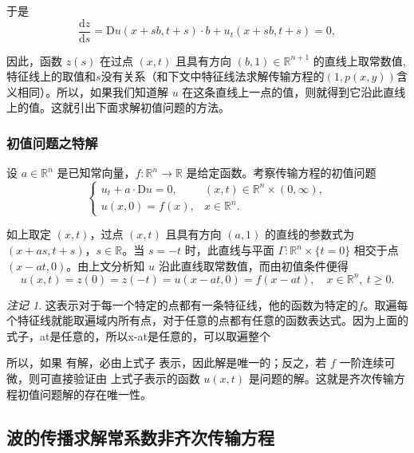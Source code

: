 \documentclass[12pt,a4paper]{article}
\numberwithin{subsection}{section}   %
\numberwithin{subsubsection}{subsection}
\theoremstyle{plain}
\theoremstyle{definition}
\theoremstyle{remark}
\newtheorem{remark}[theorem]{注记}
\theoremstyle{remark}
\begin{document}
	于是
	\begin{equation}
	\frac{\mathrm{d}z}{\mathrm{d}s} = \mathrm{D}u(x + sb, t + s) \cdot b + u_t(x + sb, t + s) = 0,
	\end{equation}
	
	因此，函数 \(z(s)\) 在过点 \((x, t)\) 且具有方向 \((b, 1) \in \mathbb{R}^{n+1}\) 的直线上取常数值,特征线上的取值和$s$没有关系（和下文中特征线法求解传输方程的$(1, p(x, y))$含义相同）。所以，如果我们知道解 \(u\) 在这条直线上一点的值，则就得到它沿此直线上的值。这就引出下面求解初值问题的方法。
	
	\subsubsection{初值问题之特解} 
	设 $a \in \mathbb{R}^n$ 是已知常向量，$f: \mathbb{R}^n \rightarrow \mathbb{R}$ 是给定函数。考察传输方程的初值问题
	\begin{equation}
		\begin{cases}
			u_t + a \cdot \mathrm{D}u = 0, & (x, t) \in \mathbb{R}^n \times (0, \infty), \\
			u(x, 0) = f(x), & x \in \mathbb{R}^n.
		\end{cases}
	\end{equation}
	
	如上取定 $(x, t)$，过点 $(x, t)$ 且具有方向 $(a, 1)$ 的直线的参数式为 $(x + a s, t + s)$，$s \in \mathbb{R}$。当 $s = -t$ 时，此直线与平面 $\Gamma: \mathbb{R}^n \times \{t = 0\}$ 相交于点 $(x - a t, 0)$。由上文分析知 $u$ 沿此直线取常数值，而由初值条件便得
	\begin{equation}\label{eq:齐次解}
	u(x,t)=	z(0)=z(-t) =u(x - a t, 0) = f(x - a t), \quad x \in \mathbb{R}^n, \ t \geq 0.
	\end{equation}
	
	\begin{remark}
	这表示对于每一个特定的点都有一条特征线，他的函数为特定的$f$。取遍每个特征线就能取遍域内所有点，对于任意的点都有任意的函数表达式。因为上面的式子，at是任意的，所以x-at是任意的，可以取遍整个
	\end{remark}
		
	所以，如果 有解，必由上式子 表示，因此解是唯一的；反之，若 $f$ 一阶连续可微，则可直接验证由 上式子表示的函数 $u(x, t)$ 是问题的解。这就是齐次传输方程初值问题解的存在唯一性。
	
\subsection{波的传播求解常系数非齐次传输方程} 
\end{document}

